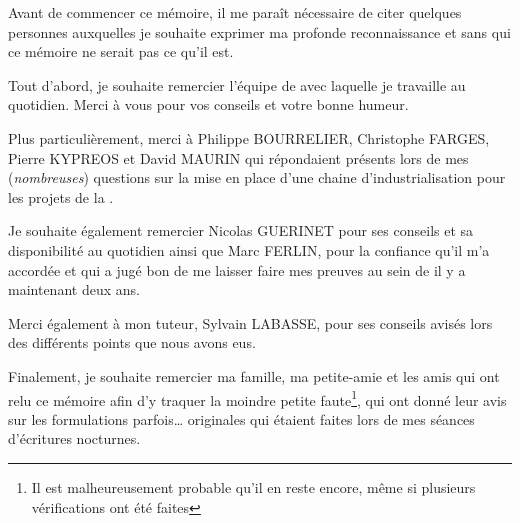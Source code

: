 \vfill

\begin{large}

Avant de commencer ce mémoire, il me paraît nécessaire de citer quelques personnes auxquelles je souhaite exprimer ma profonde reconnaissance et sans qui ce mémoire ne serait pas ce qu'il est.

Tout d’abord, je souhaite remercier l'équipe \naq{} de \onepoint{} avec laquelle je travaille au quotidien. Merci à vous pour vos conseils et votre bonne humeur.

Plus particulièrement, merci à Philippe BOURRELIER, Christophe FARGES, Pierre KYPREOS et David MAURIN qui répondaient présents lors de mes (\textit{nombreuses}) questions sur la mise en place d'une chaine d'industrialisation pour les projets de la \naq.

Je souhaite également remercier Nicolas GUERINET pour ses conseils et sa disponibilité au quotidien ainsi que Marc FERLIN, pour la confiance qu’il m’a accordée et qui a jugé bon de me laisser faire mes preuves au sein de \onepoint{} il y a maintenant deux ans.

Merci également à mon tuteur, Sylvain LABASSE, pour ses conseils avisés lors des différents points que nous avons eus.

Finalement, je souhaite remercier ma famille, ma petite-amie et les amis qui ont relu ce mémoire afin d'y traquer la moindre petite faute\footnote{Il est malheureusement probable qu'il en reste encore, même si plusieurs vérifications ont été faites}, qui ont donné leur avis sur les formulations parfois\ldots{} originales qui étaient faites lors de mes séances d'écritures nocturnes.

\end{large}

\vfill